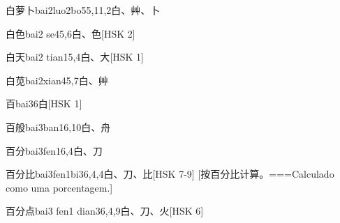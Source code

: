 \begin{EntryWithPhonetic}{白萝卜}{bai2luo2bo5}{5,11,2}{⽩、⾋、⼘}
\end{EntryWithPhonetic}

\begin{EntryWithPhonetic}{白色}{bai2 se4}{5,6}{⽩、⾊}[HSK 2]
\end{EntryWithPhonetic}

\begin{EntryWithPhonetic}{白天}{bai2 tian1}{5,4}{⽩、⼤}[HSK 1]
\end{EntryWithPhonetic}

\begin{EntryWithPhonetic}{白苋}{bai2xian4}{5,7}{⽩、⾋}
\end{EntryWithPhonetic}

\begin{EntryWithPhonetic}{百}{bai3}{6}{⽩}[HSK 1]
\end{EntryWithPhonetic}

\begin{EntryWithPhonetic}{百般}{bai3ban1}{6,10}{⽩、⾈}
\end{EntryWithPhonetic}

\begin{EntryWithPhonetic}{百分}{bai3fen1}{6,4}{⽩、⼑}
\end{EntryWithPhonetic}

\begin{EntryWithPhonetic}{百分比}{bai3fen1bi3}{6,4,4}{⽩、⼑、⽐}[HSK 7-9]
  [按百分比计算。===Calculado como uma porcentagem.]
\end{EntryWithPhonetic}

\begin{EntryWithPhonetic}{百分点}{bai3 fen1 dian3}{6,4,9}{⽩、⼑、⽕}[HSK 6]
\end{EntryWithPhonetic}

